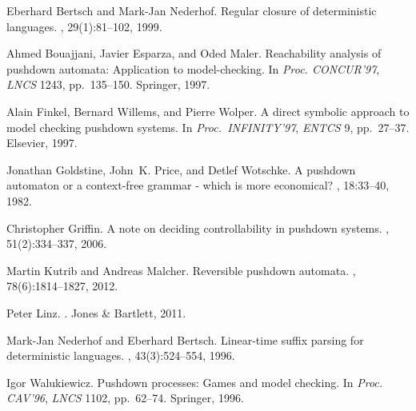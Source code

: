 \documentclass{llncs}
\begin{document}
\begin{thebibliography}{1}

Eberhard Bertsch and Mark-Jan Nederhof.
\newblock Regular closure of deterministic languages.
, 29(1):81--102, 1999.

Ahmed Bouajjani, Javier Esparza, and Oded Maler.
\newblock Reachability analysis of pushdown automata: Application to
  model-checking.
\newblock In {\em Proc. CONCUR'97}, {\em LNCS} 1243, pp.\ 135--150. Springer, 1997.

Alain Finkel, Bernard Willems, and Pierre Wolper.
\newblock A direct symbolic approach to model checking pushdown systems.
\newblock In {\em Proc.\ INFINITY'97}, {\em ENTCS} 9, pp.\ 27--37.
  Elsevier, 1997.

Jonathan Goldstine, John~K. Price, and Detlef Wotschke.
\newblock A pushdown automaton or a context-free grammar - which is more
  economical?
, 18:33--40, 1982.

Christopher Griffin.
\newblock A note on deciding controllability in pushdown systems.
, 51(2):334--337, 2006.

Martin Kutrib and Andreas Malcher.
\newblock Reversible pushdown automata.
, 78(6):1814--1827, 2012.

Peter Linz.
.
\newblock Jones \& Bartlett, 2011.

Mark-Jan Nederhof and Eberhard Bertsch.
\newblock Linear-time suffix parsing for deterministic languages.
, 43(3):524--554, 1996.

Igor Walukiewicz.
\newblock Pushdown processes: Games and model checking.
\newblock In {\em Proc. CAV'96}, {\em LNCS} 1102, pp.\ 62--74. Springer, 1996.

\end{thebibliography}
\end{document}

